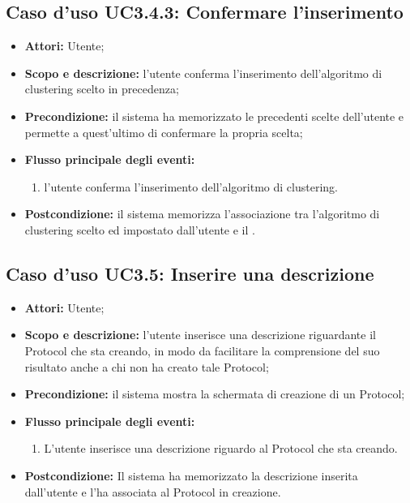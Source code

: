 \subsection{Caso d'uso UC3.4.3: Confermare l'inserimento}
\begin{itemize}
\item \textbf{Attori:} Utente;
\item \textbf{Scopo e descrizione:} l'utente conferma l'inserimento dell'algoritmo di clustering\glossario{} scelto in precedenza;
\item \textbf{Precondizione:} il sistema ha memorizzato le precedenti scelte dell'utente e permette a quest'ultimo di confermare la propria scelta;
\item \textbf{Flusso principale degli eventi:}
\begin{enumerate}
\item l'utente conferma l'inserimento dell'algoritmo di clustering\glossario{}.
\end{enumerate}
\item \textbf{Postcondizione:} il sistema memorizza l'associazione tra l'algoritmo di clustering\glossario{} scelto ed impostato dall'utente e il \protocol{}.
\end{itemize}

\subsection{Caso d'uso UC3.5: Inserire una descrizione}
\begin{itemize}
\item \textbf{Attori:} Utente;
\item \textbf{Scopo e descrizione:} l'utente inserisce una descrizione riguardante il Protocol\glossario{} che sta creando, in modo da facilitare  la comprensione del suo risultato anche a chi non ha creato tale Protocol\glossario{};
\item \textbf{Precondizione:} il sistema mostra la schermata di creazione di un Protocol\glossario{};
\item \textbf{Flusso principale degli eventi:}
\begin{enumerate}
\item L'utente inserisce una descrizione riguardo al Protocol\glossario{} che sta creando.
\end{enumerate}
\item \textbf{Postcondizione:} Il sistema ha memorizzato la descrizione inserita dall'utente e l'ha associata al Protocol\glossario{} in creazione.
\end{itemize}



